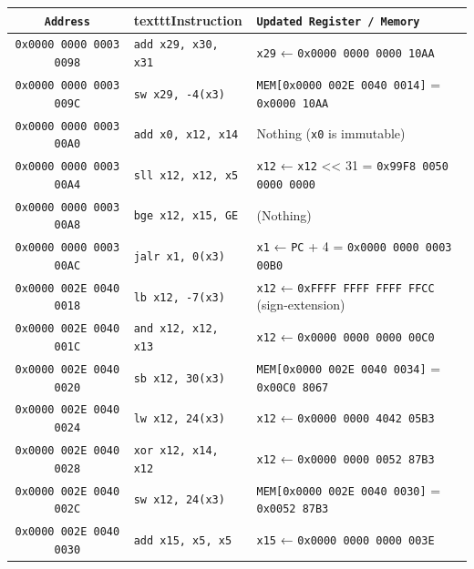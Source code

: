 \documentclass[12pt]{article}
\begin{document}
\begin{longtable}{|c|l|p{9cm}|}
    \hline
    \textbf{\texttt{Address}} & \textbf{texttt{Instruction}} & \textbf{\texttt{Updated Register / Memory}} \\
    \hline
    \endhead

    \hline
    \endfoot

    \hline
    \endlastfoot

    \texttt{0x0000 0000 0003 0098} & \texttt{add x29, x30, x31} & \texttt{x29} ← \texttt{0x0000 0000 0000 10AA} \\
    \hline
    \texttt{0x0000 0000 0003 009C} & \texttt{sw x29, -4(x3)} & \texttt{MEM[0x0000 002E 0040 0014]} = \texttt{0x0000 10AA} \\
    \hline
    \texttt{0x0000 0000 0003 00A0} & \texttt{add x0, x12, x14} & Nothing (\texttt{x0} is immutable) \\
    \hline
    \texttt{0x0000 0000 0003 00A4} & \texttt{sll x12, x12, x5} & \texttt{x12} ← \texttt{x12} << 31 = \texttt{0x99F8 0050 0000 0000} \\
    \hline
    \texttt{0x0000 0000 0003 00A8} & \texttt{bge x12, x15, GE} & (Nothing) \\
    \hline
    \texttt{0x0000 0000 0003 00AC} & \texttt{jalr x1, 0(x3)} & \texttt{x1} ← \texttt{PC} + 4 = \texttt{0x0000 0000 0003 00B0} \\
    \hline
    \texttt{0x0000 002E 0040 0018} & \texttt{lb x12, -7(x3)} & \texttt{x12} ← \texttt{0xFFFF FFFF FFFF FFCC} (sign-extension) \\
    \hline
    \texttt{0x0000 002E 0040 001C} & \texttt{and x12, x12, x13} & \texttt{x12} ← \texttt{0x0000 0000 0000 00C0} \\
    \hline
    \texttt{0x0000 002E 0040 0020} & \texttt{sb x12, 30(x3)} & \texttt{MEM[0x0000 002E 0040 0034]} = \texttt{0x00C0 8067} \\
    \hline
    \texttt{0x0000 002E 0040 0024} & \texttt{lw x12, 24(x3)} & \texttt{x12} ← \texttt{0x0000 0000 4042 05B3} \\
    \hline
    \texttt{0x0000 002E 0040 0028} & \texttt{xor x12, x14, x12} & \texttt{x12} ← \texttt{0x0000 0000 0052 87B3} \\
    \hline
    \texttt{0x0000 002E 0040 002C} & \texttt{sw x12, 24(x3)} & \texttt{MEM[0x0000 002E 0040 0030]} = \texttt{0x0052 87B3} \\
    \hline
    \texttt{0x0000 002E 0040 0030} & \texttt{add x15, x5, x5} & \texttt{x15} ← \texttt{0x0000 0000 0000 003E} \\

\end{longtable}
\end{document}

